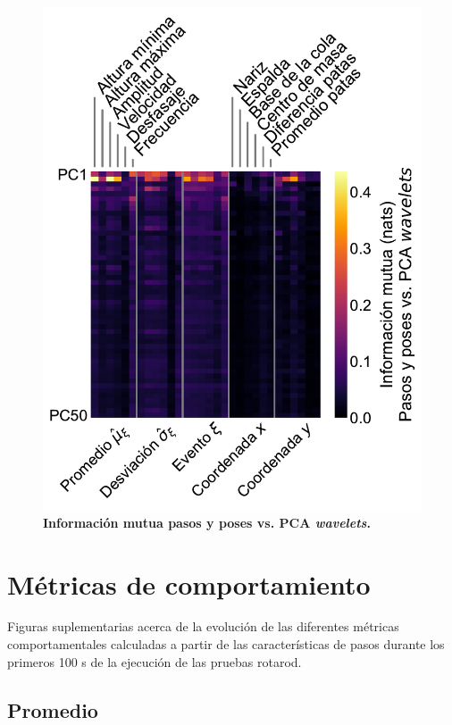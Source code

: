 \begin{appendix}
    \begin{figure}[htbp]
        \centering
        \includegraphics[width=0.7\linewidth]{figuras/capitulo4/mi_pca_wav_scaler_stp.pdf}
        \caption{\textbf{Información mutua pasos y poses vs. PCA \textit{wavelets}.}}
        \label{fig:capitulo4_mi_pca_wav_scaler_stp}
    \end{figure}

    \clearpage

    \chapter{Métricas de comportamiento}\label{cha:apendice_metricas}

    Figuras suplementarias acerca de la evolución de las diferentes métricas comportamentales calculadas a partir de las características de pasos durante los primeros 100 s de la ejecución de las pruebas rotarod.

    \clearpage

    \section{Promedio}\label{sec:apendice_promedio}


\end{appendix}

